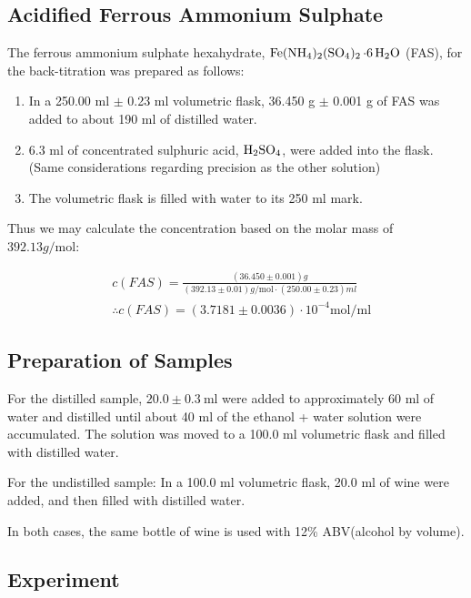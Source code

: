 \subsection{Acidified Ferrous Ammonium Sulphate}
The ferrous ammonium sulphate hexahydrate, $\ce{Fe(NH4)2(SO4)2 \cdot {6} H2O}$ (FAS), for the back-titration was prepared as follows:
\begin{enumerate}
	\item In a 250.00 ml $\pm$ 0.23 ml volumetric flask, 36.450 g $\pm$ 0.001 g of FAS was added to about 190 ml of distilled water.
	
	\item 6.3 ml of concentrated sulphuric acid, $\ce{H2SO4}$, were added into the flask. (Same considerations regarding precision as the other solution)
	
	\item The volumetric flask is filled with water to its 250 ml mark.
\end{enumerate}

Thus we may calculate the concentration based on the molar mass of $392.13 \si{g\per\mole}$:

\begin{equation}
\begin{split}
&c(FAS) = \frac{ (36.450 \pm 0.001) \si{g} }{ (392.13 \pm 0.01) \si{g\per\mole} \cdot (250.00 \pm 0.23)\si{ml} }\\
&\therefore c(FAS) = (3.7181 \pm 0.0036) \cdot 10^{-4} \si{\mole\per\ml}
\end{split}
\end{equation}

\subsection{Preparation of Samples}
For the distilled sample, $20.0 \pm \SI{0.3}{\milli\litre}$ were added to approximately 60 ml of water and distilled until about 40 ml of the ethanol + water solution were accumulated. The solution was moved to a 100.0 ml volumetric flask and filled with distilled water.

For the undistilled sample: In a 100.0 ml volumetric flask, 20.0 ml of wine were added, and then filled with distilled water.

In both cases, the same bottle of wine is used with 12\% ABV(alcohol by volume).

\subsection{Experiment}

